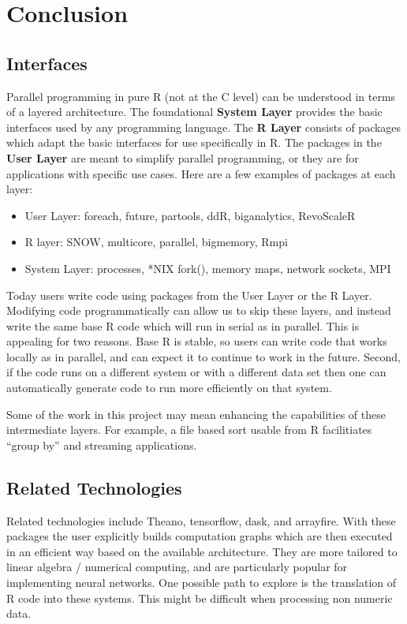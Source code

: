 \documentclass[12pt]{article}
\begin{document}
\section{Conclusion}

\subsection{Interfaces}

Parallel programming in pure R (not at the C level) can be understood in
terms of a layered architecture. The foundational \textbf{System Layer}
provides the basic interfaces used by any programming language. The
\textbf{R Layer} consists of packages which adapt the basic interfaces for
use specifically in R. The packages in the \textbf{User Layer} are meant to
simplify parallel programming, or they are for applications with specific
use cases.  Here are a few examples of packages at each layer:

\begin{itemize}
\item User Layer: foreach, future, partools, ddR, biganalytics, RevoScaleR
\item R layer: SNOW, multicore, parallel, bigmemory, Rmpi
\item System Layer: processes, *NIX fork(), memory maps, network sockets,
    MPI
\end{itemize}

Today users write code using packages from the User Layer or the R Layer.
Modifying code programmatically can allow us to skip these layers, and
instead write the same base R code which will run in serial as in parallel.
This is appealing for two reasons. Base R is stable, so users can write
code that works locally as in parallel, and can expect it to continue to
work in the future. Second, if the code runs on a different system or with
a different data set then one can automatically generate code to run more
efficiently on that system.

Some of the work in this project may mean enhancing the capabilities of these
intermediate layers. For example, a file based sort usable from R facilitiates
``group by'' and streaming applications.

\subsection{Related Technologies}

Related technologies include Theano, tensorflow, dask, and arrayfire. With
these packages the user explicitly builds computation graphs which are then
executed in an efficient way based on the available architecture. They are
more tailored to linear algebra / numerical computing, and are particularly
popular for implementing neural networks. One possible path to explore is
the translation of R code into these systems. This might be difficult when
processing non numeric data.
\end{document}
